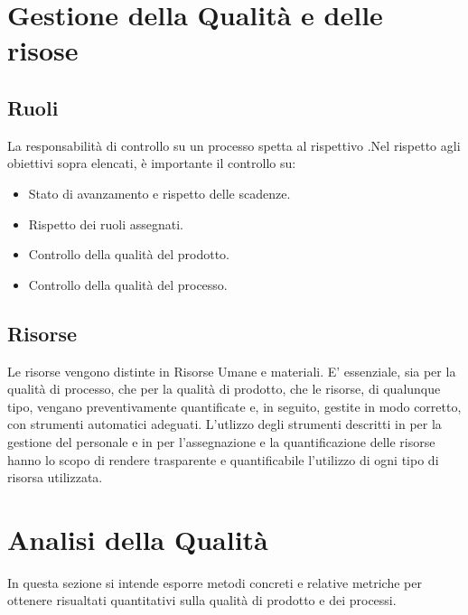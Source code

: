 \documentclass[12pt,a4paper]{article}
\begin{document}
\section{Gestione della Qualità e delle risose}
\subsection{Ruoli}
La responsabilità di controllo su un processo spetta al rispettivo \PM{}.Nel rispetto agli obiettivi sopra elencati, è importante il controllo su:
\begin{itemize}
	\item Stato di avanzamento e rispetto delle scadenze.
	\item Rispetto dei ruoli assegnati.
	\item Controllo della qualità del prodotto.
	\item Controllo della qualità del processo. 
\end{itemize}

\subsection{Risorse}
Le risorse vengono distinte in Risorse Umane e materiali. E' essenziale, sia per la qualità di processo, che per la qualità di prodotto, che le risorse, di qualunque tipo, vengano preventivamente quantificate e, in seguito, gestite in modo corretto, con strumenti automatici adeguati.
L'utlizzo degli strumenti descritti in \NdP{} per la gestione del personale e in \PdP{} per l'assegnazione e la quantificazione delle risorse hanno lo scopo di rendere trasparente e quantificabile l'utilizzo di ogni tipo di risorsa utilizzata.

\section{Analisi della Qualità}
In questa sezione si intende esporre metodi concreti e relative metriche per ottenere risualtati quantitativi sulla qualità di prodotto e dei processi. 
\end{document}

